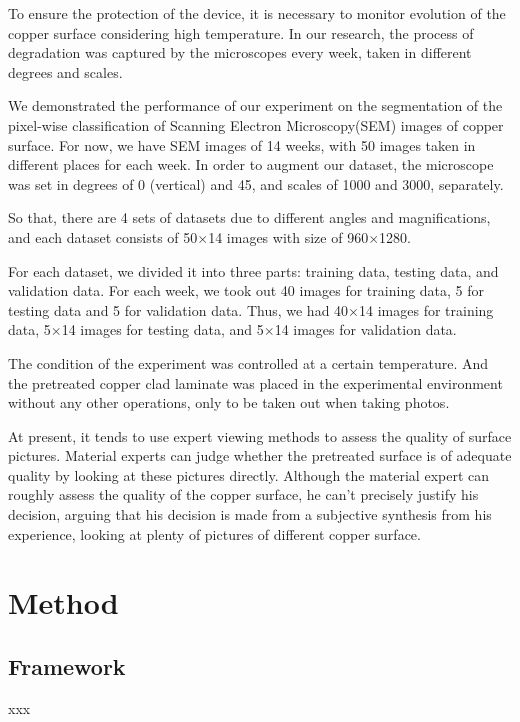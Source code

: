 \documentclass[10pt,twocolumn,letterpaper]{article}
\begin{document}
To ensure the protection of the device, it is necessary to monitor evolution of the copper surface considering high temperature.
In our research, the process of degradation was captured by the microscopes every week, taken in different degrees and scales.

We demonstrated the performance of our experiment on the segmentation of the pixel-wise classification of Scanning Electron Microscopy(SEM) images of copper surface. For now, we have SEM images of 14 weeks, with 50 images taken in different places for each week.
In order to augment our dataset, the microscope was set in degrees of 0 (vertical) and 45, and scales of 1000 and 3000, separately.

So that, there are 4 sets of datasets due to different angles and magnifications, and each dataset consists of 50$\times$14 images with size of 960$\times$1280.

For each dataset, we divided it into three parts: training data, testing data, and validation data.
For each week, we took out 40 images for training data, 5 for testing data and 5 for validation data.
Thus, we had 40$\times$14 images for training data, 5$\times$14 images for testing data, and 5$\times$14 images for validation data.

The condition of the experiment was controlled at a certain temperature. And the pretreated copper clad laminate was placed in the experimental environment without any other operations, only to be taken out when taking photos. 

At present, it tends to use expert viewing methods to assess the quality of surface pictures.
Material experts can judge whether the pretreated surface is of adequate quality by looking at these pictures directly.
Although the material expert can roughly assess the quality of the copper surface, he can't precisely justify his decision, arguing that his decision is made from a subjective synthesis from his experience, looking at plenty of pictures of different copper surface.

\section{Method}

\subsection{Framework}
xxx
\end{document}

